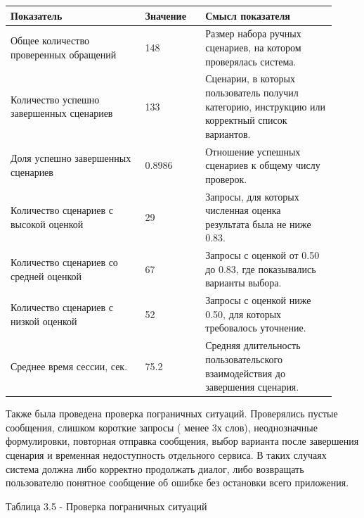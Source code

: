 \documentclass[14pt,a4paper]{extarticle}
\renewcommand{\textbf}[1]{#1}
\newcommand{\TableHead}[1]{{\centering\arraybackslash\bfseries #1\par}}
\numberwithin{figure}{section}
\numberwithin{table}{section}
\begin{document}
\begin{longtable}[]{@{}|p{0.38\linewidth}|p{0.17\linewidth}|p{0.37\linewidth}|@{}}
\hline
\TableHead{Показатель} & \TableHead{Значение} & \TableHead{Смысл показателя} \\ \hline
\endhead
Общее количество проверенных обращений & 148 & Размер набора ручных сценариев, на котором проверялась система. \\ \hline
Количество успешно завершенных сценариев & 133 & Сценарии, в которых пользователь получил категорию, инструкцию или корректный список вариантов. \\ \hline
Доля успешно завершенных сценариев & 0.8986 & Отношение успешных сценариев к общему числу проверок. \\ \hline
Количество сценариев с высокой оценкой & 29 & Запросы, для которых численная оценка результата была не ниже 0.83. \\ \hline
Количество сценариев со средней оценкой & 67 & Запросы с оценкой от 0.50 до 0.83, где показывались варианты выбора. \\ \hline
Количество сценариев с низкой оценкой & 52 & Запросы с оценкой ниже 0.50, для которых требовалось уточнение. \\ \hline
Среднее время сессии, сек. & 75.2 & Средняя длительность пользовательского взаимодействия до завершения сценария. \\ \hline
\end{longtable}

Также была проведена проверка пограничных ситуаций. Проверялись пустые
сообщения, слишком короткие запросы ( менее 3х слов), неоднозначные
формулировки, повторная отправка сообщения, выбор варианта после
завершения сценария и временная недоступность отдельного сервиса. В
таких случаях система должна либо корректно продолжать диалог, либо
возвращать пользователю понятное сообщение об ошибке без остановки всего
приложения.

\textbf{Таблица 3.5 - Проверка пограничных ситуаций}
\end{document}
